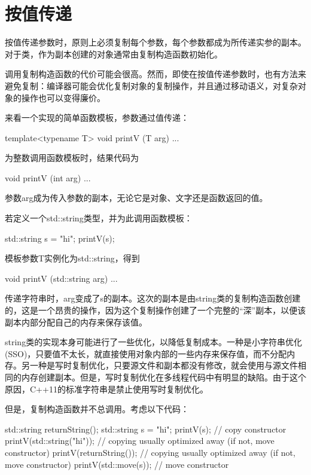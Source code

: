 \section{按值传递}
按值传递参数时，原则上必须复制每个参数，每个参数都成为所传递实参的副本。对于类，作为副本创建的对象通常由复制构造函数初始化。

调用复制构造函数的代价可能会很高。然而，即使在按值传递参数时，也有方法来避免复制：编译器可能会优化复制对象的复制操作，并且通过移动语义，对复杂对象的操作也可以变得廉价。

来看一个实现的简单函数模板，参数通过值传递：

\begin{cpp}
template<typename T>
void printV (T arg) {
	...
}
\end{cpp}

为整数调用函数模板时，结果代码为

\begin{cpp}
void printV (int arg) {
	...
}
\end{cpp}

参数arg成为传入参数的副本，无论它是对象、文字还是函数返回的值。

若定义一个std::string类型，并为此调用函数模板：

\begin{cpp}
std::string s = "hi";
printV(s);
\end{cpp}

模板参数T实例化为std::string，得到

\begin{cpp}
void printV (std::string arg) {
	...
}
\end{cpp}

传递字符串时，arg变成了s的副本。这次的副本是由string类的复制构造函数创建的，这是一个昂贵的操作，因为这个复制操作创建了一个完整的“深”副本，以便该副本内部分配自己的内存来保存该值。

\begin{notice}
string类的实现本身可能进行了一些优化，以降低复制成本。一种是小字符串优化(SSO)，只要值不太长，就直接使用对象内部的一些内存来保存值，而不分配内存。另一种是写时复制优化，只要源文件和副本都没有修改，就会使用与源文件相同的内存创建副本。但是，写时复制优化在多线程代码中有明显的缺陷。由于这个原因，C++11的标准字符串是禁止使用写时复制优化。
\end{notice}

但是，复制构造函数并不总调用。考虑以下代码：

\begin{cpp}
std::string returnString();
std::string s = "hi";
printV(s); // copy constructor
printV(std::string("hi")); // copying usually optimized away (if not, move constructor)
printV(returnString()); // copying usually optimized away (if not, move constructor)
printV(std::move(s)); // move constructor
\end{cpp}

